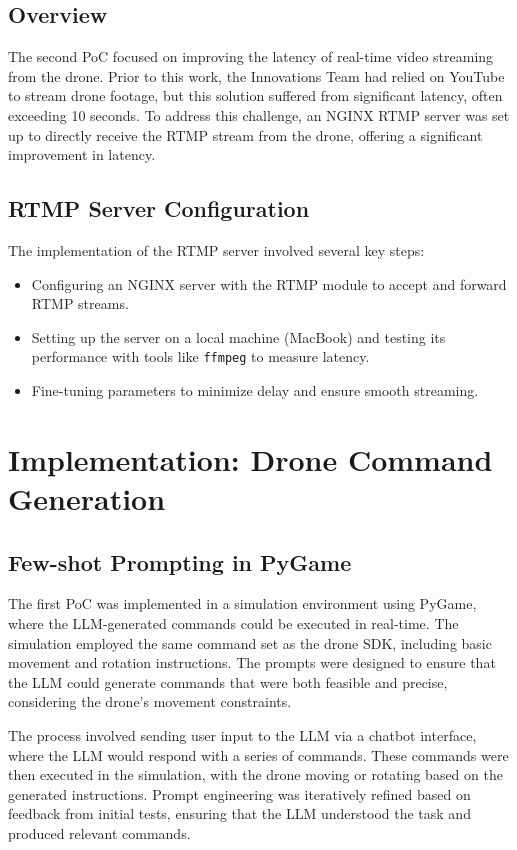 \subsection{Overview}
The second \ac{PoC} focused on improving the latency of real-time video streaming from the drone. 
Prior to this work, the Innovations Team had relied on YouTube to stream drone footage, but this solution suffered from significant latency, often exceeding 10 seconds. 
To address this challenge, an NGINX \ac{RTMP} server was set up to directly receive the \ac{RTMP} stream from the drone, offering a significant improvement in latency.

\subsection{RTMP Server Configuration}
The implementation of the \ac{RTMP} server involved several key steps:
\begin{itemize}
    \item Configuring an NGINX server with the \ac{RTMP} module to accept and forward \ac{RTMP} streams.
    \item Setting up the server on a local machine (MacBook) and testing its performance with tools like \texttt{ffmpeg} to measure latency.
    \item Fine-tuning parameters to minimize delay and ensure smooth streaming.
\end{itemize}

\section{Implementation: Drone Command Generation}
\subsection{Few-shot Prompting in PyGame}
The first \ac{PoC} was implemented in a simulation environment using PyGame, where the \ac{LLM}-generated commands could be executed in real-time. 
The simulation employed the same command set as the drone SDK, including basic movement and rotation instructions. 
The prompts were designed to ensure that the \ac{LLM} could generate commands that were both feasible and precise, considering the drone's movement constraints.

The process involved sending user input to the \ac{LLM} via a chatbot interface, where the \ac{LLM} would respond with a series of commands. 
These commands were then executed in the simulation, with the drone moving or rotating based on the generated instructions. 
Prompt engineering was iteratively refined based on feedback from initial tests, ensuring that the \ac{LLM} understood the task and produced relevant commands.

